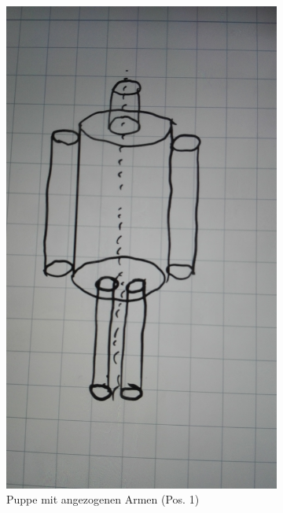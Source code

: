 \begin{figure}[H]
\caption{Positionen der Puppe}
\begin{subfigure}{0.495\linewidth}
\centering
\includegraphics[width=\textwidth]{images/puppe_an.jpg}
\caption{Puppe mit angezogenen Armen (Pos. 1)}
\end{subfigure}
\begin{subfigure}{0.495\linewidth}
\centering

\end{subfigure}
\end{figure}
